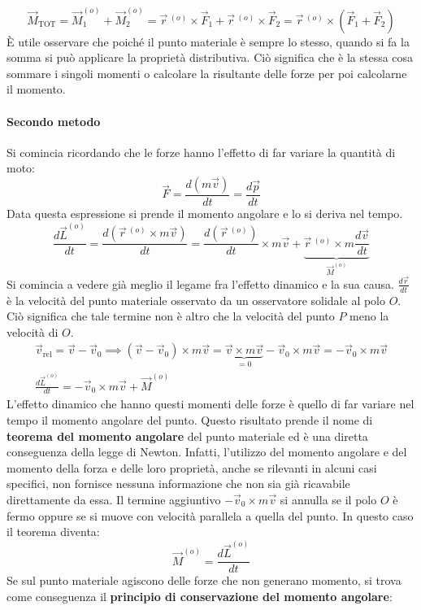 \documentclass[10pt,a4paper]{book}
\begin{document}
\FloatBarrier
\[
	\vec{M}_{\text{TOT}}=\vec{M}^{(o)}_1+\vec{M}^{(o)}_2= \vec{r}\,^{(o)} \times\vec{F}_1+\vec{r}\,^{(o)} \times \vec{F}_2= \vec{r}\,^{(o)} \times (\vec{F}_1+\vec{F}_2)
\]
È utile osservare che poiché il punto materiale è sempre lo stesso, quando si fa la somma si può applicare la proprietà distributiva. Ciò significa che è la stessa cosa sommare i singoli momenti o calcolare la risultante delle forze per poi calcolarne il momento.

\paragraph{Secondo metodo} Si comincia ricordando che le forze hanno l'effetto di far variare la quantità di moto:
\[
	\vec{F}=\frac{d(m\vec{v})}{dt}=\frac{d\vec{p}}{dt}
\]
Data questa espressione si prende il momento angolare e lo si deriva nel tempo.
\[
	\frac{d\vec{L}^{(o)}}{dt}=\frac{d(\vec{r}\,^{(o)}\times m\vec{v})}{dt}=\frac{d(\vec{r}\,^{(o)})}{dt}\times m\vec{v}+\underbrace{\vec{r}\,^{(o)}\times m\frac{d\vec{v}}{dt}}_{\vec{M}^{(o)}}
\]
Si comincia a vedere già meglio il legame fra l'effetto dinamico e la sua causa. $\frac{d\vec{r}}{dt}$ è la velocità del punto materiale osservato da un osservatore solidale al polo $O$. Ciò significa che tale termine non è altro che la velocità del punto $P$ meno la velocità di $O$.
\begin{gather*}
	\vec{v}_{\text{rel}}=\vec{v}-\vec{v}_0 \implies (\vec{v}-\vec{v}_0)\times m\vec{v}=\underbrace{\vec{v}\times m\vec{v}}_{=0}-\vec{v}_0 \times m\vec{v}=-\vec{v}_0 \times m\vec{v} \\
	\boxed{\frac{d\vec{L}^{(o)}}{dt} =-\vec{v}_0 \times m\vec{v}+ \vec{M}^{(o)}}
\end{gather*}
L'effetto dinamico che hanno questi momenti delle forze è quello di far variare nel tempo il momento angolare del punto. Questo risultato prende il nome di \textbf{teorema del momento angolare} del punto materiale ed è una diretta conseguenza della legge di Newton. Infatti, l'utilizzo del momento angolare e del momento della forza e delle loro proprietà, anche se rilevanti in alcuni casi specifici, non fornisce nessuna informazione che non sia già ricavabile direttamente da essa. Il termine aggiuntivo $-\vec{v}_0 \times m\vec{v}$ si annulla se il polo $O$ è fermo oppure se si muove con velocità parallela a quella del punto. In questo caso il teorema diventa:
\[
	\boxed{\vec{M}^{(o)}= \frac{d\vec{L}^{(o)}}{dt}}
\]
Se sul punto materiale agiscono delle forze che non generano momento, si trova come conseguenza il \textbf{principio di conservazione del momento angolare}:
\end{document}
